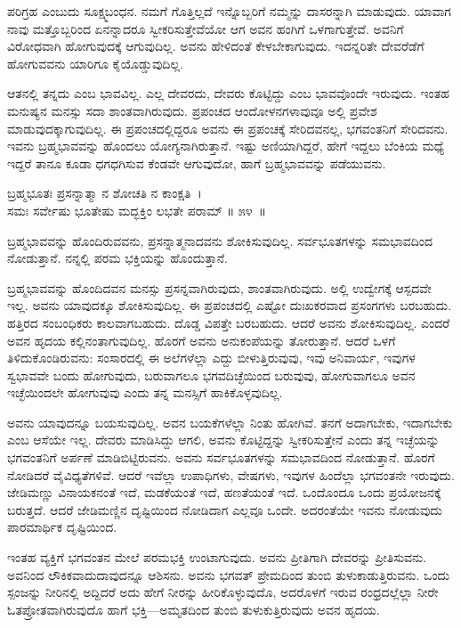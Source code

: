 ಪರಿಗ್ರಹ ಎಂಬುದು ಸೂಕ್ಷ್ಮಬಂಧನ. ನಮಗೆ ಗೊತ್ತಿಲ್ಲದೆ ಇನ್ನೊಬ್ಬರಿಗೆ ನಮ್ಮನ್ನು ದಾಸ\-ರನ್ನಾಗಿ ಮಾಡುವುದು. ಯಾವಾಗ ನಾವು ಮತ್ತೊಬ್ಬರಿಂದ ಏನನ್ನಾದರೂ ಸ್ವೀಕರಿಸುತ್ತೇವೆಯೋ ಆಗ ಅವನ ಹಂಗಿಗೆ ಒಳಗಾಗುತ್ತೇವೆ. ಅವನಿಗೆ ವಿರೋಧವಾಗಿ ಹೋಗುವುದಕ್ಕೆ ಆಗುವುದಿಲ್ಲ. ಅವನು ಹೇಳಿದಂತೆ ಕೇಳಬೇಕಾಗುವುದು. ಇದನ್ನರಿತೇ ದೇವರೆಡೆಗೆ ಹೋಗುವವನು ಯಾರಿಗೂ ಕೈಯೊಡ್ಡುವುದಿಲ್ಲ.

ಆತನಲ್ಲಿ ತನ್ನದು ಎಂಬ ಭಾವವಿಲ್ಲ. ಎಲ್ಲ ದೇವರದು, ದೇವರು ಕೊಟ್ಟಿದ್ದು ಎಂಬ ಭಾವವೊಂದೇ ಇರುವುದು. ಇಂತಹ ಮನುಷ್ಯನ ಮನಸ್ಸು ಸದಾ ಶಾಂತವಾಗಿರುವುದು. ಪ್ರಪಂಚದ ಆಂದೋಳನಗಳಾವುವೂ ಅಲ್ಲಿ ಪ್ರವೇಶ ಮಾಡುವುದಕ್ಕಾಗುವುದಿಲ್ಲ. ಈ ಪ್ರಪಂಚದಲ್ಲಿದ್ದರೂ ಅವನು ಈ ಪ್ರಪಂಚಕ್ಕೆ ಸೇರಿದವನಲ್ಲ, ಭಗವಂತನಿಗೆ ಸೇರಿದವನು. ಇವನು ಬ್ರಹ್ಮಭಾವವನ್ನು ಹೊಂದಲು ಯೋಗ್ಯನಾಗಿರುತ್ತಾನೆ. ಇಷ್ಟು ಅಣಿಯಾಗಿದ್ದರೆ, ಹೇಗೆ ಇದ್ದಲು ಬೆಂಕಿಯ ಮಧ್ಯೆ ಇದ್ದರೆ ತಾನೂ ಕೂಡಾ ಧಗಧಗಿಸುವ ಕೆಂಡವೇ ಆಗುವುದೋ, ಹಾಗೆ ಬ್ರಹ್ಮಭಾವವನ್ನು ಪಡೆಯುವನು.

\begin{shloka}
ಬ್ರಹ್ಮಭೂತಃ ಪ್ರಸನ್ನಾತ್ಮಾ ನ ಶೋಚತಿ ನ ಕಾಂಕ್ಷತಿ~।\\ಸಮಃ ಸರ್ವೇಷು ಭೂತೇಷು ಮದ್ಭಕ್ತಿಂ ಲಭತೇ ಪರಾಮ್ \hfill॥ ೫೪~॥
\end{shloka}

\begin{artha}
ಬ್ರಹ್ಮಭಾವವನ್ನು ಹೊಂದಿರುವವನು, ಪ್ರಸನ್ನಾತ್ಮನಾದವನು ಶೋಕಿಸುವುದಿಲ್ಲ. ಸರ್ವಭೂತಗಳನ್ನು ಸಮಭಾವದಿಂದ ನೋಡುತ್ತಾನೆ. ನನ್ನಲ್ಲಿ ಪರಮ ಭಕ್ತಿಯನ್ನು ಹೊಂದುತ್ತಾನೆ.
\end{artha}

ಬ್ರಹ್ಮಭಾವವನ್ನು ಹೊಂದಿದವನ ಮನಸ್ಸು ಪ್ರಸನ್ನವಾಗಿರುವುದು, ಶಾಂತವಾಗಿರುವುದು. ಅಲ್ಲಿ ಉದ್ವೇಗಕ್ಕೆ ಆಸ್ಪದವೇ ಇಲ್ಲ. ಅವನು ಯಾವುದಕ್ಕೂ ಶೋಕಿಸುವುದಿಲ್ಲ. ಈ ಪ್ರಪಂಚದಲ್ಲಿ ಎಷ್ಟೋ ದುಃಖಕರವಾದ ಪ್ರಸಂಗಗಳು ಬರಬಹುದು. ಹತ್ತಿರದ ಸಂಬಂಧಿಕರು ಕಾಲವಾಗಬಹುದು. ದೊಡ್ಡ ವಿಪತ್ತೇ ಬರಬಹುದು. ಆದರೆ ಅವನು ಶೋಕಿಸುವುದಿಲ್ಲ. ಎಂದರೆ ಅವನ ಹೃದಯ ಕಲ್ಲಿನಂತಾಗುವುದಿಲ್ಲ. ಹೊರಗೆ ಅವನು ಅನುಕಂಪೆಯನ್ನು ತೋರುತ್ತಾನೆ. ಆದರೆ ಒಳಗೆ ತಿಳಿದುಕೊಂಡಿರುವನು: ಸಂಸಾರದಲ್ಲಿ ಈ ಅಲೆಗಳೆಲ್ಲಾ ಎದ್ದು ಬೀಳುತ್ತಿರುವುವು, ಇವು ಅನಿವಾರ್ಯ, ಇವುಗಳ ಸ್ವಭಾವವೇ ಬಂದು ಹೋಗುವುದು, ಬರುವಾಗಲೂ ಭಗವದಿಚ್ಛೆಯಿಂದ ಬರುವುವು, ಹೋಗುವಾಗಲೂ ಅವನ ಇಚ್ಛೆಯಿಂದಲೇ ಹೋಗುವುವು ಎಂದು ತನ್ನ ಮನಸ್ಸಿಗೆ ಹಾಕಿಕೊಳ್ಳವುದಿಲ್ಲ.

ಅವನು ಯಾವುದನ್ನೂ ಬಯಸುವುದಿಲ್ಲ. ಅವನ ಬಯಕೆಗಳೆಲ್ಲಾ ನಿಂತು ಹೋಗಿವೆ. ತನಗೆ ಅದಾಗಬೇಕು, ಇದಾಗಬೇಕು ಎಂಬ ಆಸೆಯೇ ಇಲ್ಲ. ದೇವರು ಮಾಡಿಸಿದ್ದು ಆಗಲಿ, ಅವನು ಕೊಟ್ಟಿದ್ದನ್ನು ಸ್ವೀಕರಿಸುತ್ತೇನೆ ಎಂದು ತನ್ನ ಇಚ್ಛೆಯನ್ನು ಭಗವಂತನಿಗೆ ಅರ್ಪಣೆ ಮಾಡಿಬಿಟ್ಟಿರುವನು. ಅವನು ಸರ್ವಭೂತಗಳನ್ನು ಸಮಭಾವದಿಂದ ನೋಡುತ್ತಾನೆ. ಹೊರಗೆ ನೋಡಿದರೆ ವೈವಿಧ್ಯತೆಗಳಿವೆ. ಆದರೆ ಇವೆಲ್ಲಾ ಉಪಾಧಿಗಳು, ವೇಷಗಳು, ಇವುಗಳ ಹಿಂದೆಲ್ಲಾ ಭಗವಂತನೇ ಇರುವುದು. ಜೇಡಿಮಣ್ಣು ವಿನಾಯಕನಂತೆ ಇದೆ, ಮಡಕೆಯಂತೆ ಇದೆ, ಹಣತೆಯಂತೆ ಇದೆ. ಒಂದೊಂದೂ ಒಂದು ಪ್ರಯೋಜನಕ್ಕೆ ಬರುತ್ತದೆ. ಆದರೆ ಜೇಡಿಮಣ್ಣಿನ ದೃಷ್ಟಿಯಿಂದ ನೋಡಿದಾಗ ಎಲ್ಲವೂ ಒಂದೇ. ಅದರಂತೆಯೇ ಇವನು ನೋಡುವುದು ಪಾರಮಾರ್ಥಿಕ ದೃಷ್ಟಿಯಿಂದ.

ಇಂತಹ ವ್ಯಕ್ತಿಗೆ ಭಗವಂತನ ಮೇಲೆ ಪರಮಭಕ್ತಿ ಉಂಟಾಗುವುದು. ಅವನು ಪ್ರೀತಿಗಾಗಿ ದೇವರನ್ನು ಪ್ರೀತಿಸುವನು. ಅವನಿಂದ ಲೌಕಿಕವಾದುದಾವುದನ್ನೂ ಆಶಿಸನು. ಅವನು ಭಗವತ್ ಪ್ರೇಮದಿಂದ ತುಂಬಿ ತುಳುಕಾಡುತ್ತಿರುವನು. ಒಂದು ಸ್ಪಂಜನ್ನು ನೀರಿನಲ್ಲಿ ಅದ್ದಿದರೆ ಅದು ಹೇಗೆ ನೀರನ್ನು ಹೀರಿಕೊಳ್ಳುವುದೊ, ಅದರೊಳಗೆ ಇರುವ ರಂಧ್ರದಲ್ಲೆಲ್ಲಾ ನೀರೇ ಓತಪ್ರೋತವಾಗಿರು\-ವುದೊ ಹಾಗೆ ಭಕ್ತಿ—ಅಮೃತದಿಂದ ತುಂಬಿ ತುಳುಕುತ್ತಿರುವುದು ಅವನ ಹೃದಯ.

